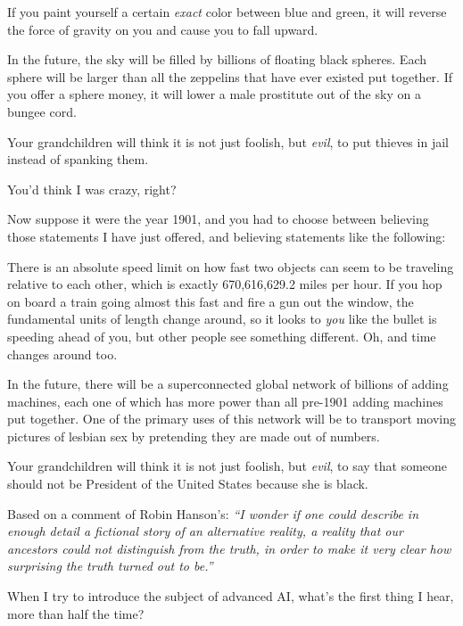 {
 If you paint yourself a certain \textit{exact} color between blue
and green, it will reverse the force of gravity on you and cause you to
fall upward.}

{
 In the future, the sky will be filled by billions of floating
black spheres. Each sphere will be larger than all the zeppelins that
have ever existed put together. If you offer a sphere money, it will
lower a male prostitute out of the sky on a bungee cord.}

{
 Your grandchildren will think it is not just foolish, but
\textit{evil}, to put thieves in jail instead of spanking them.}

{
 You'd think I was crazy, right?}

{
 Now suppose it were the year 1901, and you had to choose between
believing those statements I have just offered, and believing
statements like the following:}

{
 There is an absolute speed limit on how fast two objects can seem
to be traveling relative to each other, which is exactly 670,616,629.2
miles per hour. If you hop on board a train going almost this fast and
fire a gun out the window, the fundamental units of length change
around, so it looks to \textit{you} like the bullet is speeding ahead
of you, but other people see something different. Oh, and time changes
around too.}

{
 In the future, there will be a superconnected global network of
billions of adding machines, each one of which has more power than all
pre-1901 adding machines put together. One of the primary uses of this
network will be to transport moving pictures of lesbian sex by
pretending they are made out of numbers.}

{
 Your grandchildren will think it is not just foolish, but
\textit{evil}, to say that someone should not be President of the
United States because she is black.}

{
 Based on a comment of Robin Hanson's:
\textit{``I wonder if one could describe in enough
detail a fictional story of an alternative reality, a reality that our
ancestors could not distinguish from the truth, in order to make it
very clear how surprising the truth turned out to
be.''}}

\myendsectiontext


{
 When I try to introduce the subject of advanced AI,
what's the first thing I hear, more than half the time?
}

